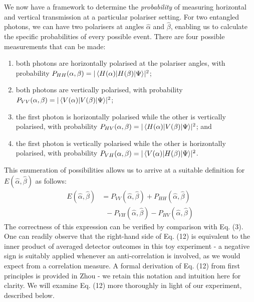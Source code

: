 \documentclass[aps,prl,nofootinbib,twocolumn,superscriptaddress,groupedaddress]{revtex4}  %
\begin{document}
We now have a framework to determine the \textit{probability} of measuring horizontal and vertical transmission at a particular polariser setting. For two entangled photons, we can have two polarisers at angles $\hat{\alpha}$ and $\hat{\beta}$, enabling us to calculate the specific probabilities of every possible event. There are four possible measurements that can be made:

\begin{enumerate}
\item both photons are horizontally polarised at the polariser angles, with probability $P_{HH}(\alpha,\beta) = \lvert \matrixel{H(\alpha)}{H(\beta)}{\Psi}\rvert ^{2}$; 
\item both photons are vertically polarised, with probability $P_{VV}(\alpha,\beta) = \lvert \matrixel{V(\alpha)}{V(\beta)}{\Psi}\rvert ^{2}$; 
\item the first photon is horizontally polarised while the other is vertically polarised, with probability $P_{HV}(\alpha,\beta) = \lvert \matrixel{H(\alpha)}{V(\beta)}{\Psi}\rvert ^{2}$; and 
\item the first photon is vertically polarised while the other is horizontally polarised, with probability $P_{VH}(\alpha,\beta) = \lvert \matrixel{V(\alpha)}{H(\beta)}{\Psi}\rvert ^{2}$. 
\end{enumerate} 

This enumeration of possibilities allows us to arrive at a suitable definition for $E(\hat{\alpha},\hat{\beta})$ as follows:
\begin{align}
E(\hat{\alpha},\hat{\beta}) &= P_{VV}(\hat{\alpha},\hat{\beta}) + P_{HH}(\hat{\alpha},\hat{\beta}) \nonumber\\
&\;\;- P_{VH}(\hat{\alpha},\hat{\beta}) - P_{HV}(\hat{\alpha},\hat{\beta})
\end{align}
The correctness of this expression can be verified by comparison with Eq. (3). One can readily observe that the right-hand side of Eq. (12) is equivalent to the inner product of averaged detector outcomes in this toy experiment - a negative sign is suitably applied whenever an anti-correlation is involved, as we would expect from a correlation measure. A formal  derivation of Eq. (12) from first principles is provided in Zhou\cite{bellderivation} - we retain this notation and intuition here for clarity. We will examine Eq. (12) more thoroughly in light of our experiment, described below.
\end{document}
